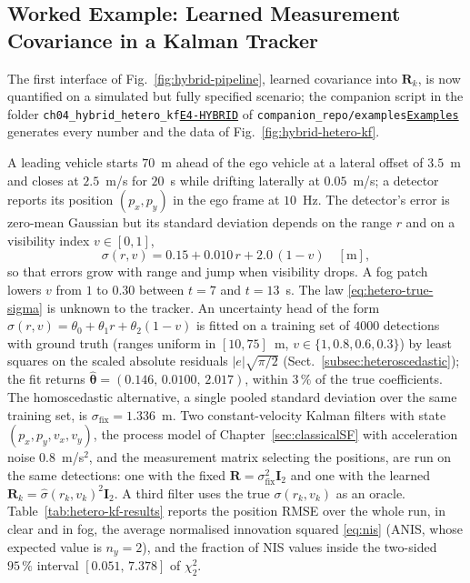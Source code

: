 \documentclass[graybox,envcountchap]{style/SNmono}
\newcommand{\repopath}[1]{\texttt{#1}}
\providecommand{\DIFadd}[1]{{\protect\color{blue} #1}} %
\providecommand{\DIFdel}[1]{{\protect\color{red} #1}} %
\DeclareRobustCommand{\RtwoDel}[1]{{\color{red}%
  \renewcommand{\DIFadd}[1]{##1}\renewcommand{\DIFdel}[1]{##1}%
  #1}}
\DeclareRobustCommand{\RtwoAdd}[1]{{\color{blue}#1}}
\DeclareRobustCommand{\codeentry}[1]{\hyperref[code:#1]{\texttt{#1}}}
\begin{document}
\subsection{Worked Example: Learned Measurement Covariance in a Kalman Tracker}
\label{subsec:hybrid-worked-example}
The first interface of Fig.~\ref{fig:hybrid-pipeline}, learned covariance into $\mathbf{R}_k$, is now quantified on a simulated but fully specified scenario; the companion script in the folder \RtwoDel{\repopath{ch04\_\allowbreak hybrid\_\allowbreak hetero\_\allowbreak kf}}\RtwoAdd{\codeentry{E4-HYBRID}} of \RtwoDel{\repopath{companion\_\allowbreak repo/\allowbreak examples}}\RtwoAdd{\codeentry{Examples}} generates every number and the data of Fig.~\ref{fig:hybrid-hetero-kf}.
\begin{example}
\label{ex:hybrid-hetero-kf}
A leading vehicle starts $70$~m ahead of the ego vehicle at a lateral offset of $3.5$~m and closes at $2.5$~m/s for $20$~s while drifting laterally at $0.05$~m/s; a detector reports its position $(p_x,p_y)$ in the ego frame at $10$~Hz. The detector's error is zero-mean Gaussian but its standard deviation depends on the range $r$ and on a visibility index $v\in[0,1]$,
\begin{equation}
\sigma(r,v)=0.15+0.010\,r+2.0\,(1-v)\quad[\mathrm{m}],
\label{eq:hetero-true-sigma}
\end{equation}
so that errors grow with range and jump when visibility drops. A fog patch lowers $v$ from $1$ to $0.30$ between $t=7$ and $t=13$~s. The law \eqref{eq:hetero-true-sigma} is unknown to the tracker. An uncertainty head of the form $\widehat{\sigma}(r,v)=\theta_0+\theta_1 r+\theta_2(1-v)$ is fitted on a training set of $4000$ detections with ground truth (ranges uniform in $[10,75]$~m, $v\in\{1,0.8,0.6,0.3\}$) by least squares on the scaled absolute residuals $|e|\sqrt{\pi/2}$ (Sect.~\ref{subsec:heteroscedastic}); the fit returns $\widehat{\boldsymbol{\theta}}=(0.146,\,0.0100,\,2.017)$, within $3\,\%$ of the true coefficients. The homoscedastic alternative, a single pooled standard deviation over the same training set, is $\sigma_{\mathrm{fix}}=1.336$~m. Two constant-velocity Kalman filters with state $(p_x,p_y,v_x,v_y)$, the process model of Chapter~\ref{sec:classicalSF} with acceleration noise $0.8$~m/s$^{2}$, and the measurement matrix selecting the positions, are run on the same detections: one with the fixed $\mathbf{R}=\sigma_{\mathrm{fix}}^{2}\mathbf{I}_2$ and one with the learned $\mathbf{R}_k=\widehat{\sigma}(r_k,v_k)^{2}\mathbf{I}_2$. A third filter uses the true $\sigma(r_k,v_k)$ as an oracle. Table~\ref{tab:hetero-kf-results} reports the position RMSE over the whole run, in clear and in fog, the average normalised innovation squared \eqref{eq:nis} (ANIS, whose expected value is $n_y=2$), and the fraction of NIS values inside the two-sided $95\,\%$ interval $[0.051,\,7.378]$ of $\chi^{2}_{2}$.

\end{example}
\end{document}
